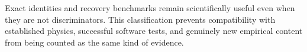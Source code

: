 Exact identities and recovery benchmarks remain scientifically useful even when they are not discriminators. This classification prevents compatibility with established physics, successful software tests, and genuinely new empirical content from being counted as the same kind of evidence.

